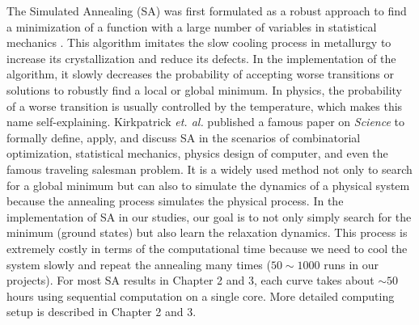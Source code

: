 The Simulated Annealing (SA) \cite{SA} was first formulated as a robust approach to find a minimization of a function with a large number of variables in statistical mechanics \cite{khachaturyan1979statistical, khachaturyan1981thermodynamic}. This algorithm imitates the slow cooling process in metallurgy to increase its crystallization and reduce its defects. In the implementation of the algorithm, it slowly decreases the probability of accepting worse transitions or solutions to robustly find a local or global minimum. In physics, the probability of a worse transition is usually controlled by the temperature, which makes this name self-explaining. Kirkpatrick {\it et. al.} \cite{SA} published a famous paper on {\it Science} to formally define, apply, and discuss SA  in the scenarios of combinatorial optimization, statistical mechanics, physics design of computer, and even the famous traveling salesman problem. It is a widely used method not only to search for a global minimum but can also to simulate the dynamics of a physical system because the annealing process simulates the physical process.
In the implementation of SA in our studies, our goal is to not only simply search for the minimum (ground states) but also learn the relaxation dynamics. This process is extremely costly in terms of the computational time because we need to cool the system slowly and repeat the annealing many times ($50\sim 1000$ runs in our projects). For most SA results in Chapter 2 and 3, each curve takes about $\sim 50$ hours using sequential computation on a single core. More detailed computing setup is described in Chapter 2 and 3.


